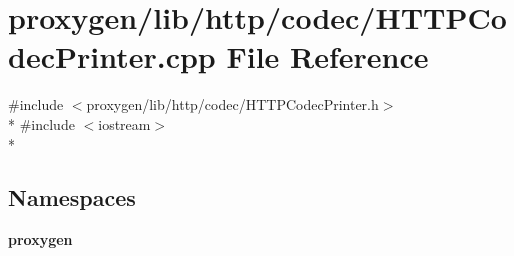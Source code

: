 \section{proxygen/lib/http/codec/\+H\+T\+T\+P\+Codec\+Printer.cpp File Reference}
\label{HTTPCodecPrinter_8cpp}
{\ttfamily \#include $<$proxygen/lib/http/codec/\+H\+T\+T\+P\+Codec\+Printer.\+h$>$}\\*
{\ttfamily \#include $<$iostream$>$}\\*
\subsection*{Namespaces}
\begin{DoxyCompactItemize}
\item 
 {\bf proxygen}
\end{DoxyCompactItemize}
